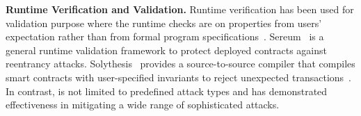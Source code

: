 

\noindent
\textbf{Runtime Verification and Validation.} Runtime verification has been used for validation purpose where the runtime checks are on properties 
from users' expectation rather than from formal program specifications~\cite{magazzeni2017validation}.
Sereum~\cite{rodler2018sereum} is a general runtime validation framework to protect 
deployed contracts against reentrancy attacks.
Solythesis~\cite{li2020securing} provides a source-to-source compiler that compiles smart contracts with user-specified invariants to reject unexpected transactions~\cite{li2020securing}.
In contrast, {\name} is not limited to predefined attack types and has demonstrated effectiveness in mitigating a wide range of sophisticated attacks.






